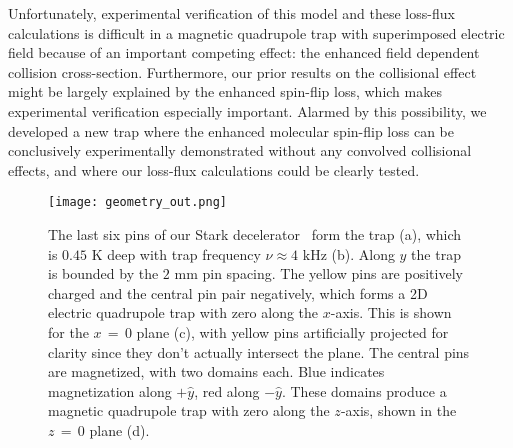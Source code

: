 \documentclass[%
 reprint,
 amsmath,amssymb,
 aps,
prl,
]{revtex4-1}
\begin{document}


Unfortunately, experimental verification of this model and these loss-flux calculations is difficult in a magnetic quadrupole trap with superimposed electric field because of an important competing effect: the enhanced field dependent collision cross-section. 
Furthermore, our prior results on the collisional effect~\cite{Stuhl2013} might be largely explained by the enhanced spin-flip loss, which makes experimental verification especially important.
Alarmed by this possibility, we developed a new trap where the enhanced molecular spin-flip loss can be conclusively experimentally demonstrated without any convolved collisional effects, and where our loss-flux calculations could be clearly tested.





\begin{figure}[tb]
\texttt{[image: geometry\_out.png]}%
\caption{
The last six pins of our Stark decelerator~\cite{Sawyer2008} form the trap (a), which is $0.45\text{ K}$ deep with trap frequency $\nu\approx4\text{ kHz}$ (b). 
Along $y$ the trap is bounded by the $2\text{ mm}$ pin spacing. 
The yellow pins are positively charged and the central pin pair negatively, which forms a 2D electric quadrupole trap with zero along the $x$-axis. 
This is shown for the $x\,{=}\,0$ plane (c), with yellow pins artificially projected for clarity since they don't actually intersect the plane. 
The central pins are magnetized, with two domains each. 
Blue indicates magnetization along $+\hat{y}$, red along $-\hat{y}$. 
These domains produce a magnetic quadrupole trap with zero along the $z$-axis, shown in the $z\,{=}\,0$ plane (d). 
\label{fig:CAD}}
\end{figure}

\end{document}
